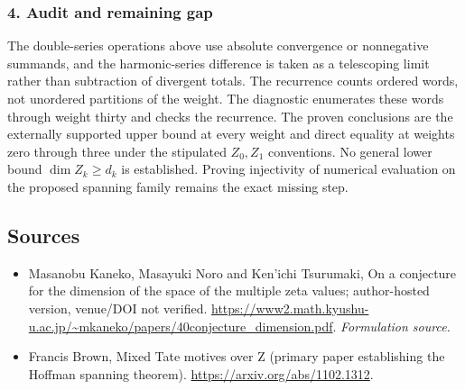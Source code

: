 \documentclass[11pt]{article}
\begin{document}
\subsubsection{4. Audit and remaining gap}
The double-series operations above use absolute convergence or nonnegative summands, and the harmonic-series difference is taken as a telescoping limit rather than subtraction of divergent totals. The recurrence counts ordered words, not unordered partitions of the weight. The diagnostic enumerates these words through weight thirty and checks the recurrence. The proven conclusions are the externally supported upper bound at every weight and direct equality at weights zero through three under the stipulated $Z_0,Z_1$ conventions. No general lower bound $\dim Z_k\ge d_k$ is established. Proving injectivity of numerical evaluation on the proposed spanning family remains the exact missing step.

\subsection{Sources}
\begin{itemize}
\item[S1]Masanobu Kaneko, Masayuki Noro and Ken'ichi Tsurumaki, On a conjecture for the dimension of the space of the multiple zeta values; author-hosted version, venue/DOI not verified.
\url{https://www2.math.kyushu-u.ac.jp/~mkaneko/papers/40conjecture_dimension.pdf}.
\textit{Formulation source.}
\item[R1] Francis Brown, Mixed Tate motives over Z (primary paper establishing the Hoffman spanning theorem).
\url{https://arxiv.org/abs/1102.1312}.
\end{itemize}
\end{document}
